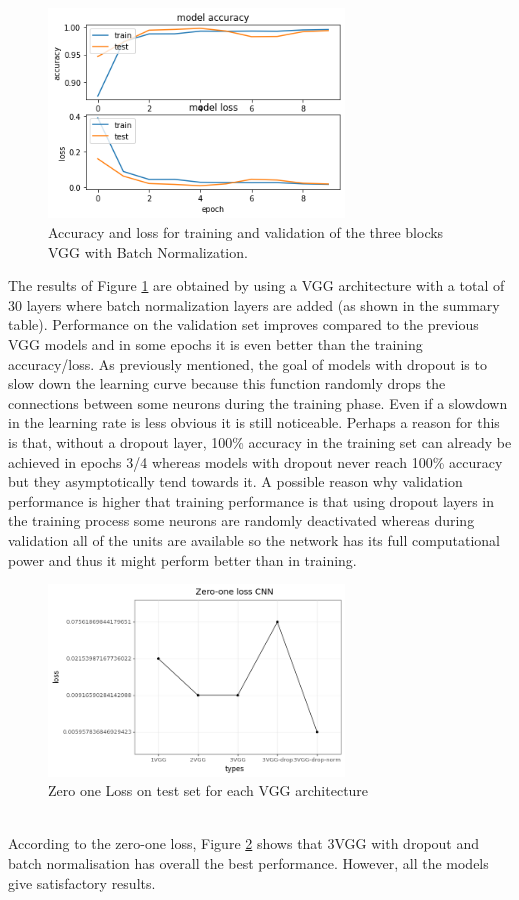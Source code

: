 \documentclass[10pt,english, openany]{book}
\begin{document}
\begin{figure}[H]
    \centering
    \includegraphics[width=0.7\textwidth]{Images/2.6. Accuracy Loss VGG Drop BN.png}
    \caption{\label{fig:5.8}Accuracy and loss for training and validation of the three blocks VGG with Batch Normalization.}
\end{figure}
\newpage
The results of Figure \ref{fig:5.8} are obtained by using a VGG architecture with a total of 30 layers where batch normalization layers are added (as shown in the summary table).
Performance on the validation set improves compared to the previous VGG models and in some epochs it is even better than the training accuracy/loss. As previously mentioned, the goal of models with dropout is to slow down the learning curve because this function randomly drops the connections between some neurons during the training phase. Even if a slowdown in the learning rate is less obvious it is still noticeable. Perhaps a reason for this is that, without a dropout layer, 100\% accuracy in the training set can already be achieved in epochs 3/4 whereas models with dropout never reach 100\% accuracy but they asymptotically tend towards it. A possible reason why validation performance is higher that training performance is that using dropout layers in the training process some neurons are randomly deactivated whereas during validation all of the units are available so the network has its full computational power and thus it might perform better than in training.
\\
\begin{figure}[H]
    \centering
    \includegraphics[width=0.7\textwidth]{Images/2.7. Test Zero One loss VGG.png}
    \caption{\label{fig: 5.9}Zero one Loss on test set for each VGG architecture}
\end{figure}
\noindent \\
According to the zero-one loss, Figure \ref{fig: 5.9} shows that 3VGG with dropout and batch normalisation has overall the best performance. However, all the models give satisfactory results.
\end{document}

